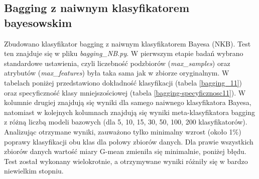 \subsection{Bagging z naiwnym klasyfikatorem bayesowskim}
Zbudowano klasyfikator bagging z naiwnym klasyfikatorem Bayesa (NKB). Test ten znajduje się w pliku \textit{bagging\_NB.py}. W pierwszym etapie badań wybrano standardowe ustawienia, czyli liczebność podzbiorów (\textit{max\_samples}) oraz atrybutów (\textit{max\_features}) była taka sama jak w zbiorze oryginalnym.
W tabelach poniżej przedstawiono dokładność klasyfikacji (tabela \ref{bagging_11}) oraz specyficzność klasy mniejszościowej (tabela \ref{bagging-specyficznosc11}). W kolumnie drugiej znajdują się wyniki dla samego naiwnego klasyfikatora Bayesa, natomiast w kolejnych kolumnach znajdują się wyniki meta-klasyfikatora bagging z różną liczbą modeli bazowych (dla 5, 10, 15, 30, 50, 100, 200 klasyfikatorów). Analizując otrzymane wyniki, zauważono tylko minimalny wzrost (około 1\%) poprawy klasyfikacji obu klas dla połowy zbiorów danych. Dla prawie wszystkich zbiorów danych wartość miary G-mean zmieniła się minimalnie, poniżej błędu. Test został wykonany wielokrotnie, a otrzymywane wyniki różniły się w bardzo niewielkim stopniu. 

